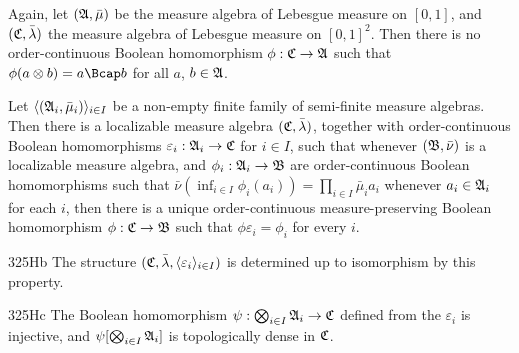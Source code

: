  Again, let $(\frak A,\bar\mu)$ be the measure
algebra of Lebesgue measure on $[0,1]$, and $(\frak C,\bar\lambda)$
the measure algebra of Lebesgue measure on $[0,1]^2$.   Then there is no
order-continuous Boolean homomorphism $\phi:\frak C\to\frak A$ such that
$\phi(a\otimes b)=a\Bcap b$ for all $a$, $b\in\frak A$.

  Let $\langle(\frak A_i,\bar\mu_i)\rangle_{i\in I}$ be a
non-empty finite family of semi-finite measure algebras.
Then there is a localizable measure algebra
$(\frak C,\bar\lambda)$, together with order-continuous Boolean
homomorphisms $\varepsilon_i:\frak A_i\to\frak C$ for $i\in I$, such that
whenever $(\frak B,\bar\nu)$ is a localizable measure algebra, and
$\phi_i:\frak A_i\to\frak B$ are
order-continuous Boolean homomorphisms such that
$\bar\nu(\inf_{i\in I}\phi_i(a_i))=\prod_{i\in I}\bar\mu_ia_i$ whenever
$a_i\in\frak A_i$ for each $i$, then there is a unique
order-continuous measure-preserving Boolean homomorphism
$\phi:\frak C\to\frak B$ such that $\phi\varepsilon_i=\phi_i$ for every $i$.

\spheader 325Hb The structure
$(\frak C,\bar\lambda,\langle\varepsilon_i\rangle_{i\in I})$ is determined up to
isomorphism by this property.

\spheader 325Hc The Boolean homomorphism
$\psi:\bigotimes_{i\in I}\frak A_i\to\frak C$ defined from the
$\varepsilon_i$
is injective, and $\psi[\bigotimes_{i\in I}\frak A_i]$ is topologically
dense in $\frak C$.

